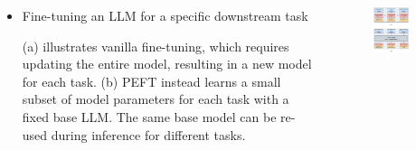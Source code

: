 \documentclass[serif, aspectratio=169]{beamer}
\begin{document}
\begin{frame}{}
    \begin{columns}
        \begin{column}{0.5\textwidth}
            \begin{itemize}
                \item  
                    \large{Fine-tuning an LLM for a specific downstream task}
                    \vspace{0.5cm}
                    \begin{outline}
                        \1 (a) illustrates vanilla fine-tuning, which requires updating the entire model, resulting in a new model for each task.
                        \vspace{0.2cm}
                        \1 (b) PEFT instead learns a small subset of model parameters for each task with a fixed base LLM. The same base model can be re-used during inference for different tasks.
                    \end{outline}
                    \vspace{0.3cm}
            \end{itemize}
        \end{column}
        \begin{column}{0.5\textwidth}
            \begin{figure}
                \centering
                \includegraphics[width=0.75\textwidth]{pic/PEFTvsFT.png}
            \end{figure}
        \end{column}
    \end{columns}
\end{frame}
\end{document}
